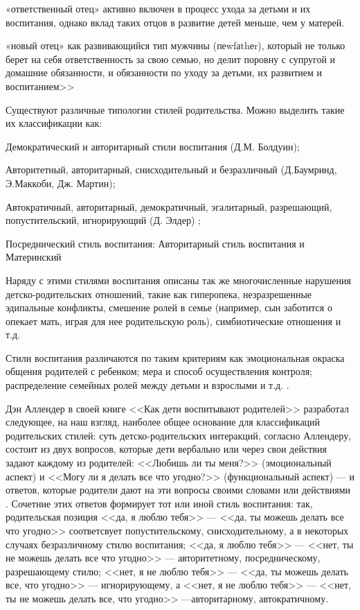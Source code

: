 \documentclass{../../common/thesisbyxetex}
\begin{document}
«ответственный отец» активно включен в процесс ухода за детьми и их воспитания, однако вклад таких
отцов в развитие детей меньше, чем у матерей.

«новый отец» как развивающийся тип мужчины (пеwfаthеr), который не только берет на себя
ответственность за свою семью, но делит поровну с супругой и домашние обязанности, и обязанности по
уходу за детьми, их развитием и воспитанием>> \cite{clec}



Существуют различные типологии стилей родительства. Можно выделить такие их классификации как:

Демократический и авторитарный стили воспитания (Д.М. Болдуин);

Авторитетный, авторитарный, снисходительный и безразличный (Д.Баумринд, Э.Маккоби, Дж. Мартин);

Автократичный, авторитарный, демократичный, эгалитарный, разрешающий, попустительский, игнорирующий
(Д. Элдер) \cite{stil};

Посреднический стиль воспитания: Авторитарный стиль воспитания и Материнский \cite[281]{strat}

Наряду с этими стилями воспитания описаны так же многочисленные нарушения детско-родительских
отношений, такие как гиперопека,  незразрешенные эдипальные конфликты, смешение ролей в семье
(например, сын заботится о опекает мать, играя для нее родительскую роль), симбиотические отношения
и т.д.


Стили воспитания различаются по таким критериям как эмоциональная окраска общения родителей с
ребенком; мера и способ осуществления контроля; распределение семейных ролей между детьми и
взрослыми и т.д. \cite{stil}.

Дэн Аллендер в своей книге <<Как дети воспитывают родителей>> разработал следующее, на наш взгляд,
наиболее общее основание для классификаций родительских стилей: суть детско-родительских
интеракций, согласно Аллендеру, состоит из двух вопросов, которые дети вербально или
через свои действия задают каждому из родителей: <<Любишь ли ты меня?>> (эмоциональный аспект) и
<<Могу ли я делать все что угодно?>> (функциональный аспект) --- и ответов, которые родители
дают на эти вопросы своими словами или действиями \cite{den}. Сочетние этих ответов формирует тот
или иной стиль воспитания: так, родительская позиция <<да, я люблю тебя>> --- <<да, ты можешь делать
все что угодно>> соответсвует попустительскому, снисходительному, а в некоторых случаях
безразличному стилю воспитания; <<да, я люблю тебя>>  --- <<нет, ты не можешь делать все что
угодно>> --- авторитетному, посредническому, разрешающему стилю; <<нет, я не люблю тебя>> --- <<да,
ты можешь делать все, что угодно>>  --- игнорирующему, а  <<нет, я не люблю тебя>> --- <<нет, ты не
можешь делать все, что угодно>> ---авторитарному, автократичному.
\end{document}
